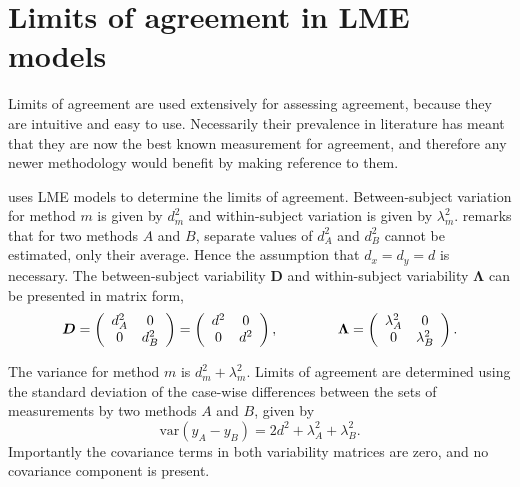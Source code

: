 \documentclass[MAIN.tex]{subfiles}
\begin{document}
	
	\newpage
	\section{Limits of agreement in LME models}
	
	Limits of agreement are used extensively for assessing agreement, because they are intuitive and easy to use.
	Necessarily their prevalence in literature has meant that they are now the best known measurement for agreement, and therefore any newer methodology would benefit by making reference to them.
	
	\citet{BXC2008} uses LME models to determine the limits of agreement. Between-subject variation for method $m$ is given by $d^2_{m}$ and within-subject variation is given by $\lambda^2_{m}$.  \citet{BXC2008} remarks that for two methods $A$ and $B$, separate values of $d^2_{A}$ and $d^2_{B}$ cannot be estimated, only their average. Hence the assumption that $d_{x}= d_{y}= d$ is necessary. The between-subject variability $\boldsymbol{D}$ and within-subject variability $\boldsymbol{\Lambda}$ can be presented in matrix form,\[
	\boldsymbol{D} = \left(%
	\begin{array}{cc}
	d^2_{A}& 0 \\
	0 & d^2_{B} \\
	\end{array}%
	\right)=\left(%
	\begin{array}{cc}
	d^2& 0 \\
	0 & d^2\\
	\end{array}%
	\right),
	\hspace{1.5cm}
	\boldsymbol{\Lambda} = \left(%
	\begin{array}{cc}
	\lambda^2_{A}& 0 \\
	0 & \lambda^2_{B} \\
	\end{array}%
	\right).
	\]
	
	The variance for method $m$ is $d^2_{m}+\lambda^2_{m}$. Limits of agreement are determined using the standard deviation of the case-wise differences between the sets of measurements by two methods $A$ and $B$, given by
	\begin{equation}
	\mbox{var} (y_{A}-y_{B}) = 2d^2 + \lambda^2_{A}+ \lambda^2_{B}.
	\end{equation}
	Importantly the covariance terms in both variability matrices are zero, and no covariance component is present.
	
\end{document}
